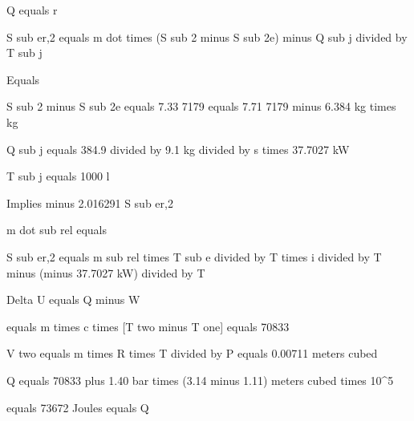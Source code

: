 Q equals r

S sub er,2 equals m dot times (S sub 2 minus S sub 2e) minus Q sub j divided by T sub j

Equals

S sub 2 minus S sub 2e equals 7.33 7179 equals 7.71 7179 minus 6.384 kg times kg

Q sub j equals 384.9 divided by 9.1 kg divided by s times 37.7027 kW

T sub j equals 1000 l

Implies minus 2.016291 S sub er,2

m dot sub rel equals

S sub er,2 equals m sub rel times T sub e divided by T times i divided by T minus (minus 37.7027 kW) divided by T

Delta U equals Q minus W

equals m times c times [T two minus T one] equals 70833

V two equals m times R times T divided by P equals 0.00711 meters cubed

Q equals 70833 plus 1.40 bar times (3.14 minus 1.11) meters cubed times 10^5

equals 73672 Joules equals Q